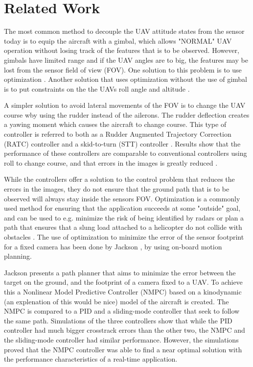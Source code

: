\section{Related Work}

The most common method to decouple the UAV attitude states from the sensor today is to equip the aircraft with a gimbal, which allows "NORMAL" UAV operation without losing track of the features that is to be observed. However, gimbals have limited range and if the UAV angles are to big, the features may be lost from the sensor field of view (FOV). One solution to this problem is to use optimization \cite{nundalSKJONG}. Another solution that uses optimization without the use of gimbal is to put constraints on the the UAVs roll angle and altitude \cite{constraintsEGBERT}.

A simpler solution to avoid lateral movements of the FOV is to change the UAV course wby using the rudder instead of the ailerons. The rudder deflection creates a yawing moment \cite{ratcFISHER} which causes the aircraft to change course. This type of controller is referred to both as a Rudder Augmented Trajectory Correction (RATC) controller \cite{ratcFISHER} and a skid-to-turn (STT) controller \cite{skidMILLS}. Results show that the performance of these controllers are comparable to conventional controllers using roll to change course, and that errors in the images is greatly reduced \cite{ratcFISHER}\cite{skidMILLS}\cite{alternateAHSAN}.

While the controllers offer a solution to the control problem that reduces the errors in the images, they do not ensure that the ground path that is to be observed will always stay inside the sensors FOV. Optimization is a commonly used method for ensuring that the application succeeds at some "outside" goal, and can be used to e.g. minimize the risk of being identified by radars \cite{radarINANC} or plan a path that ensures that a slung load attached to a helicopter do not collide with obstacles \cite{slungANDERSLACOUR}. The use of optimization to minimize the error of the sensor footprint for a fixed camera has been done by Jackson \cite{optimJACKSON}, by using on-board motion planning.

Jackson presents a path planner that aims to minimize the error between the target on the ground, and the footprint of a camera fixed to a UAV. To achieve this a Nonlinear Model Predictive Controller (NMPC) based on a kinodynamic (an explenation of this would be nice) model of the aircraft is created. The NMPC is compared to a PID and a sliding-mode controller that seek to follow the same path. Simulations of the three controllers show that while the PID controller had much bigger crosstrack errors than the other two, the NMPC and the sliding-mode controller had similar performance. However, the simulations proved that the NMPC controller was able to find a near optimal solution with the performance characteristics of a real-time application.